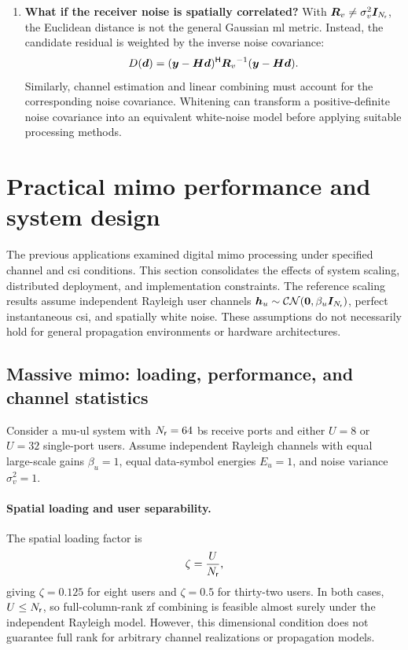 \begin{enumerate}[label=\textbf{\arabic*.}]
	\item \textbf{What if the receiver noise is spatially correlated?}
	With $\bm{R}_v\ne\sigma_v^2\bm{I}_{N_{\mathsf{r}}}$, the Euclidean distance is not the general Gaussian \ac{ml} metric. Instead, the candidate residual is weighted by the inverse noise covariance:
	\begin{equation*}
		D(\bm{d})
		=(\bm{y}-\bm{H}\bm{d})^{\mathsf H}
		{\bm{R}_v}^{-1}
		(\bm{y}-\bm{H}\bm{d}).
	\end{equation*}
	Similarly, channel estimation and linear combining must account for the corresponding noise covariance. Whitening can transform a positive-definite noise covariance into an equivalent white-noise model before applying suitable processing methods.
\end{enumerate}

\section{Practical \ac{mimo} performance and system design}
\label{sec06:practical}
The previous applications examined digital \ac{mimo} processing under specified channel and \ac{csi} conditions. This section consolidates the effects of system scaling, distributed deployment, and implementation constraints. The reference scaling results assume independent Rayleigh user channels $\bm{h}_u\sim\mathcal{CN}(\bm{0},\beta_u\bm{I}_{N_{\mathsf{r}}})$, perfect instantaneous \ac{csi}, and spatially white noise. These assumptions do not necessarily hold for general propagation environments or hardware architectures.

\subsection{Massive \ac{mimo}: loading, performance, and channel statistics}
Consider a \ac{mu}-\ac{ul} system with $N_{\mathsf{r}}=64$ \ac{bs} receive ports and either $U=8$ or $U=32$ single-port users. Assume independent Rayleigh channels with equal large-scale gains $\beta_u=1$, equal data-symbol energies $E_u=1$, and noise variance $\sigma_v^2=1$.

\paragraph{Spatial loading and user separability.}
The spatial loading factor is
\begin{equation*}
	\zeta=\frac{U}{N_{\mathsf{r}}},
\end{equation*}
giving $\zeta=0.125$ for eight users and $\zeta=0.5$ for thirty-two users. In both cases, $U\leq N_{\mathsf{r}}$, so full-column-rank \ac{zf} combining is feasible almost surely under the independent Rayleigh model. However, this dimensional condition does not guarantee full rank for arbitrary channel realizations or propagation models.

